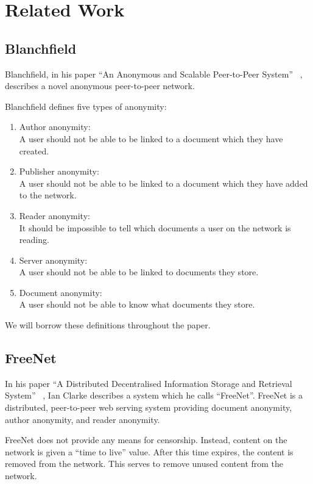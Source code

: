 \chapter{Related Work}

\section{Blanchfield}

Blanchfield, in his paper ``An Anonymous and Scalable Peer-to-Peer System'' ~\cite{blanchfield},
describes a novel anonymous peer-to-peer network.

Blanchfield defines five types of anonymity:
\begin{enumerate}
    \item{Author anonymity: \\
        A user should not be able to be linked to a document which they have created.
    }
    \item{Publisher anonymity: \\
        A user should not be able to be linked to a document which they have added to the network.
    }
    \item{Reader anonymity: \\
        It should be impossible to tell which documents a user on the network is reading.
    }
    \item{Server anonymity: \\
        A user should not be able to be linked to documents they store.
    }
    \item{Document anonymity: \\
        A user should not be able to know what documents they store.
    }
\end{enumerate}

We will borrow these definitions throughout the paper.

\section{FreeNet}

In his paper ``A Distributed Decentralised Information Storage and Retrieval System'' ~\cite{freenet},
Ian Clarke describes a system which he calls ``FreeNet''. FreeNet is a distributed, peer-to-peer web
serving system providing document anonymity, author anonymity, and reader anonymity.

FreeNet does not provide any means for censorship. Instead, content on the network is given a
``time to live'' value. After this time expires, the content is removed from the network. This serves
to remove unused content from the network.


